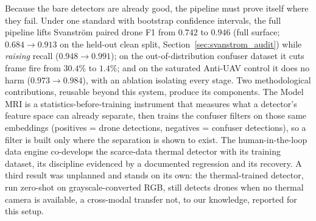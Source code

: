 \documentclass[12pt,a4paper,oneside,openany]{book}
\begin{document}
Because the bare detectors are already good, the pipeline must prove itself where they fail. Under one standard with bootstrap confidence intervals, the full pipeline lifts Svanstr\"om paired drone F1 from $0.742$ to $0.946$ (full surface; $0.684 \to 0.913$ on the held-out clean split, Section~\ref{sec:svanstrom_audit}) while \emph{raising} recall ($0.948 \to 0.991$); on the out-of-distribution confuser dataset it cuts frame fire from $30.4\%$ to $1.4\%$; and on the saturated Anti-UAV control it does no harm ($0.973 \to 0.984$), with an ablation isolating every stage. Two methodological contributions, reusable beyond this system, produce its components. The Model MRI is a statistics-before-training instrument that measures what a detector's feature space can already separate, then trains the confuser filters on those same embeddings (positives = drone detections, negatives = confuser detections), so a filter is built only where the separation is shown to exist. The human-in-the-loop data engine co-develops the scarce-data thermal detector with its training dataset, its discipline evidenced by a documented regression and its recovery. A third result was unplanned and stands on its own: the thermal-trained detector, run zero-shot on grayscale-converted RGB, still detects drones when no thermal camera is available, a cross-modal transfer not, to our knowledge, reported for this setup.


\tableofcontents
\newpage
{}
\setcounter{chapter}{0}


% 










\backmatter
\sloppy
\printbibliography[heading=bibintoc, title=Bibliography]

\end{document}
